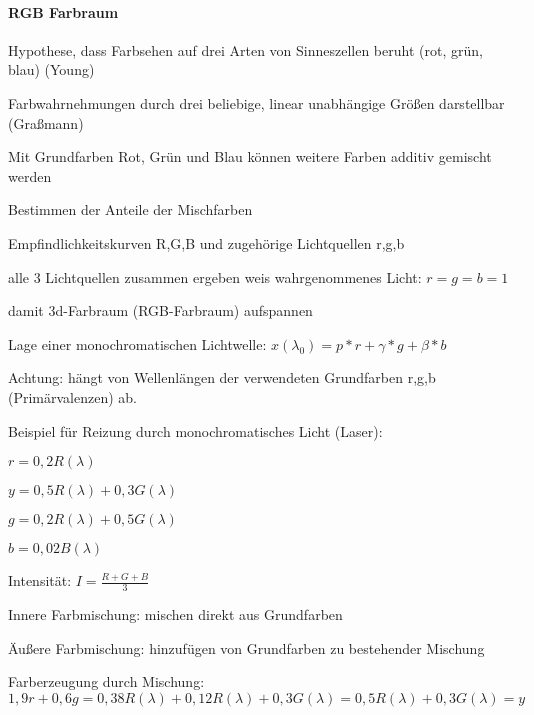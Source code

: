 \documentclass[landscape]{article}
\begin{document}
\begin{multicols}{3}
  \paragraph{RGB Farbraum}
  \begin{itemize*}
    \item Hypothese, dass Farbsehen auf drei Arten von Sinneszellen beruht (rot, grün, blau) (Young)
    \item Farbwahrnehmungen durch drei beliebige, linear unabhängige Größen darstellbar (Graßmann)
    \item Mit Grundfarben Rot, Grün und Blau können weitere Farben additiv gemischt werden
    \item Bestimmen der Anteile der Mischfarben
    \begin{itemize*}
      \item Empfindlichkeitskurven R,G,B und zugehörige Lichtquellen r,g,b
      \item alle 3 Lichtquellen zusammen ergeben weis wahrgenommenes Licht: $r=g=b=1$
      \item damit 3d-Farbraum (RGB-Farbraum) aufspannen
      \item Lage einer monochromatischen Lichtwelle: $x(\lambda_0)=p*r+\gamma*g+\beta*b$
      \item Achtung: hängt von Wellenlängen der verwendeten Grundfarben r,g,b (Primärvalenzen) ab.
    \end{itemize*}
    \item Beispiel für Reizung durch monochromatisches Licht (Laser):
    \begin{itemize*}
      \item $r=0,2R(\lambda)$
      \item $y=0,5R(\lambda)+0,3G(\lambda)$
      \item $g=0,2R(\lambda)+0,5G(\lambda)$
      \item $b=0,02B(\lambda)$
    \end{itemize*}
    \item Intensität: $I=\frac{R+G+B}{3}$
    \item Innere Farbmischung: mischen direkt aus Grundfarben
    \item Äußere Farbmischung: hinzufügen von Grundfarben zu bestehender Mischung
  \end{itemize*}
  
  Farberzeugung durch Mischung:
  $$1,9r + 0,6g = 0,38R(\lambda)+0,12R(\lambda)+0,3G(\lambda)=0,5R(\lambda)+0,3G(\lambda) = y$$
  

\end{multicols}
\end{document}
